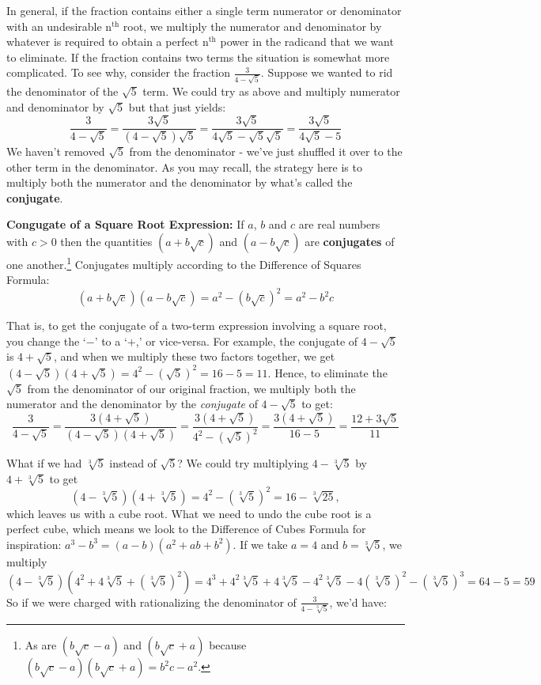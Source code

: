 In general, if the fraction contains either a single term numerator or denominator with an undesirable $\text{n}^{\text{th}}$ root, we multiply the numerator and denominator by whatever is required to obtain a perfect $\text{n}^{\text{th}}$ power in the radicand that we want to eliminate. If the fraction contains two terms the situation is somewhat more complicated.  To see why, consider the fraction $\frac{3}{4 - \sqrt{5}}$.  Suppose we wanted to rid the denominator of the $\sqrt{5}$ term.  We could try as above and multiply numerator and denominator by $\sqrt{5}$ but that just yields: \[ \dfrac{3}{4 - \sqrt{5}} = \dfrac{3\sqrt{5}}{(4 - \sqrt{5})\sqrt{5}} = \dfrac{3\sqrt{5}}{4\sqrt{5} - \sqrt{5}\sqrt{5}} = \dfrac{3\sqrt{5}}{4\sqrt{5} - 5}\] We haven't removed $\sqrt{5}$ from the denominator - we've just shuffled it over to the other term in the denominator.  As you may recall, the strategy here is to multiply both the numerator and the denominator by what's called the \textbf{conjugate}.  

\medskip

\colorbox{ResultColor}{\bbm

\begin{defn}\label{squarerootconj} \textbf{Congugate of a Square Root Expression:}  If $a$, $b$ and $c$ are real numbers with $c > 0$ then the quantities $(a + b \sqrt{c})$ and $(a - b\sqrt{c})$ are \textbf{conjugates} of one another.\footnote{As are $(b\sqrt{c} -a)$ and $(b\sqrt{c} + a)$ because $(b\sqrt{c} -a)(b\sqrt{c} + a) = b^2c - a^2$.}  Conjugates multiply according to the Difference of Squares Formula:  \[ (a + b \sqrt{c})(a - b\sqrt{c}) = a^2 - (b \sqrt{c})^2 = a^2 - b^2c\]
\end{defn}
\ebm}

\medskip

That is, to get the conjugate of a two-term expression involving a square root, you change the `$-$' to a `$+$,' or vice-versa.  For example, the conjugate of $4 - \sqrt{5}$ is $4 + \sqrt{5}$, and when we multiply these two factors together, we get $(4 - \sqrt{5})(4 + \sqrt{5}) = 4^2 - (\sqrt{5})^2 = 16 - 5 = 11$.  Hence, to eliminate the $\sqrt{5}$ from the denominator of our original fraction, we multiply both the numerator and the denominator by the \textit{conjugate} of $4-\sqrt{5}$ to get: \[\dfrac{3}{4 - \sqrt{5}} = \dfrac{3 (4 + \sqrt{5})}{(4 - \sqrt{5})(4 + \sqrt{5})} = \dfrac{3 (4 + \sqrt{5})}{4^2 - (\sqrt{5})^2} = \dfrac{3(4 + \sqrt{5})}{16 - 5} = \dfrac{12 + 3\sqrt{5}}{11}\] 

What if we had $\sqrt[3]{5}$ instead of $\sqrt{5}$?  We could try multiplying $4 - \sqrt[3]{5}$ by $4 + \sqrt[3]{5}$ to get  \[(4 - \sqrt[3]{5})(4 + \sqrt[3]{5}) = 4^2 - (\sqrt[3]{5})^2 = 16 - \sqrt[3]{25},\] which leaves us with a cube root.  What we need to undo the cube root is a perfect cube, which means we look to the Difference of Cubes Formula for inspiration:  $a^3 - b^3 = (a-b)(a^2+ab+b^2)$.  If we take $a = 4$ and $b = \sqrt[3]{5}$, we multiply \[ (4 - \sqrt[3]{5})(4^2 + 4\sqrt[3]{5} + (\sqrt[3]{5})^2) = 4^3 + 4^2\sqrt[3]{5} + 4 \sqrt[3]{5} - 4^2\sqrt[3]{5}-4(\sqrt[3]{5})^2 - (\sqrt[3]{5})^3 = 64 - 5 = 59\] So if we were charged with rationalizing the denominator of $\frac{3}{4 - \sqrt[3]{5}}$, we'd have:

